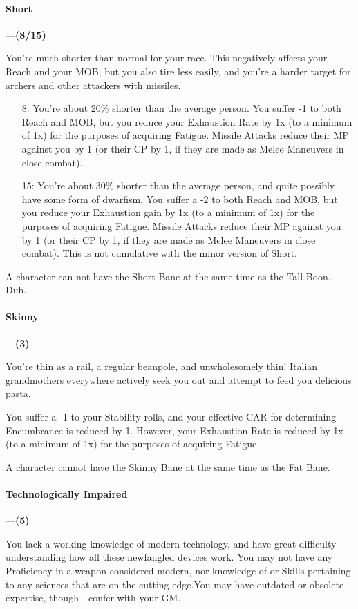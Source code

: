 \documentclass[oneside,11pt,english]{book}
\begin{document}
\paragraph{\label{bane:Short}Short}---\quad\textbf{(8/15) }\par
You're much shorter than normal for your race. This negatively affects your Reach and your MOB, but you also tire less easily, and you're a harder target for archers and other attackers with missiles.
\begin{itemize}
	\item [8:] You're about 20\% shorter than the average person. You suffer -1 to both Reach and MOB, but you reduce your Exhaustion Rate by 1x (to a minimum of 1x) for the purposes of acquiring Fatigue. Missile Attacks reduce their MP against you by 1 (or their CP by 1, if they are made as Melee Maneuvers in close combat). 
	\item [15:] You're about 30\% shorter than the average person, and quite possibly have some form of dwarfism. You suffer a -2 to both Reach and MOB, but you reduce your Exhaustion gain by 1x (to a minimum of 1x) for the purposes of acquiring Fatigue. Missile Attacks reduce their MP against you by 1 (or their CP by 1, if they are made as Melee Maneuvers in close combat). This is not cumulative with the minor version of Short.
\end{itemize}
A character can not have the Short Bane at the same time as the Tall Boon. Duh. 

\paragraph{\label{bane:Skinny}Skinny}---\quad\textbf{(3) }\par
You’re thin as a rail, a regular beanpole, and unwholesomely thin! Italian grandmothers everywhere 
actively seek you out and attempt to feed you delicious pasta.


You suffer a -1 to your Stability rolls, and your effective CAR for determining Encumbrance is reduced by 1. However, your Exhaustion Rate is reduced by 1x (to a minimum of 1x) for the purposes of acquiring Fatigue.


A character cannot have the Skinny Bane at the same time as the Fat Bane.
\paragraph{\label{bane:Technologically Impaired}Technologically Impaired}---\quad\textbf{(5) }\par
You lack a working knowledge of modern technology, and have great difficulty understanding how all 
these newfangled devices work. You may not have any Proficiency in a weapon considered modern, nor 
knowledge of or Skills pertaining to any sciences that are on the cutting edge.You may have outdated or 
obsolete expertise, though—confer with your GM. 
\end{document}
